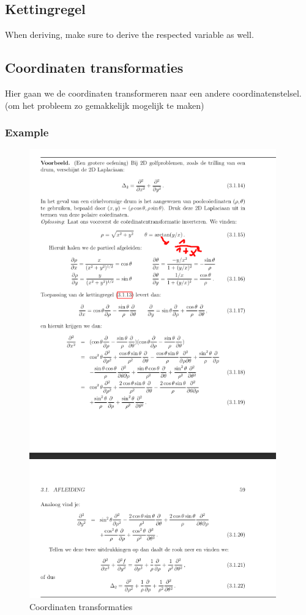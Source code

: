\documentclass[a4paper]{article}
\begin{document}
\subsection{Kettingregel}

When deriving, make sure to derive the respected variable as well.

\subsection{Coordinaten transformaties}

Hier gaan we de coordinaten transformeren naar een andere coordinatenstelsel. (om het probleem zo gemakkelijk mogelijk te maken)

\subsubsection{Example}

\begin{figure}[H]
	\begin{center}
		\includegraphics[width=0.95\textwidth]{./images/coordinaten.png}
	\end{center}
	\caption{Coordinaten transformaties}
	\label{}
\end{figure}
\end{document}
